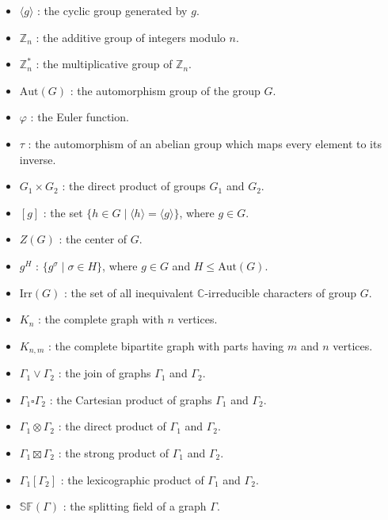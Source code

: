 \documentclass[12pt,a4paper]{article}
\def \leq {\leqslant}
\begin{document}
	\begin{itemize}
		\item $\langle g\rangle$ : the cyclic group generated by $g$.
		\item $\mathbb Z_n$ : the additive group of integers modulo $n$.
		\item $\mathbb Z_n^*$ : the multiplicative group of $\mathbb Z_n$.
		\item $\mathrm{Aut}(G)$ : the automorphism group of the group $G$.
		\item $\varphi$ : the Euler function.
		\item $\tau$ : the automorphism of an abelian group which maps every element to its inverse.
		\item $G_1\times G_2$ : the direct product of groups $G_1$ and $G_2$. 
		\item $[g]$ : the set $\{h\in G\mid \langle h\rangle=\langle g\rangle\}$, where $g\in G$.
		\item $Z(G)$ : the center of $G$.
		\item $g^H$ : $\{g^\sigma\mid \sigma\in H\}$, where $g\in G$ and $H\leq\mathrm{Aut}(G)$.
		\item $\mathrm{Irr}(G)$ : the set of all inequivalent $\mathbb C$-irreducible characters of group $G$.
		\item $K_n$ : the complete graph with $n$ vertices.
		\item $K_{n,m}$ : the complete bipartite graph with parts having $m$ and $n$ vertices. 
		\item $\Gamma_1\vee\Gamma_2$ : the join of graphs $\Gamma_1$ and $\Gamma_2$.
		\item $\Gamma_1 \square \Gamma_2$ : the Cartesian product of graphs $\Gamma_1$ and $\Gamma_2$.
		\item $\Gamma_1 \otimes \Gamma_2$ : the direct product of $\Gamma_1$ and $\Gamma_2$.
		\item $\Gamma_1 \boxtimes \Gamma_2$ : the strong product of $\Gamma_1$ and $\Gamma_2$.
		\item $\Gamma_1[ \Gamma_2]$ : the lexicographic product of $\Gamma_1$ and $\Gamma_2$.
		\item $\mathbb{SF}(\Gamma)$ : the splitting field of a graph $\Gamma$.
	\end{itemize}
	
	
	
\end{document}
